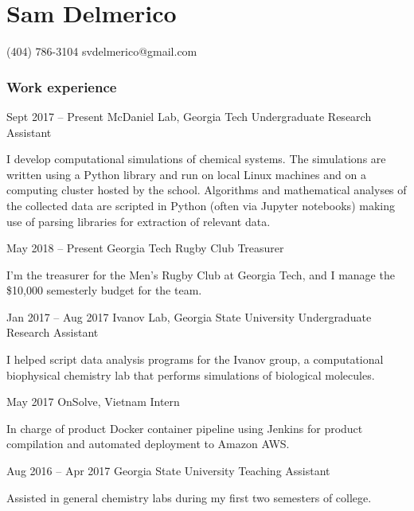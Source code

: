 \documentclass{tccv}
\begin{document}
\part[]{Sam Delmerico}

    {(404) 786-3104}
    {svdelmerico@gmail.com}

\section{Work experience}

\begin{eventlist}

\item{Sept 2017 -- Present}
     {McDaniel Lab, Georgia Tech}
     {Undergraduate Research Assistant}

I develop computational simulations of chemical systems. The simulations are written using a Python library and run on local Linux machines and on a computing cluster hosted by the school. Algorithms and mathematical analyses of the collected data are scripted in Python (often via Jupyter notebooks) making use of parsing libraries for extraction of relevant data.

\item{May 2018 -- Present}
     {Georgia Tech Rugby Club}
     {Treasurer}

I'm the treasurer for the Men's Rugby Club at Georgia Tech, and I manage the \$10,000 semesterly budget for the team.

\item{Jan 2017 -- Aug 2017}
     {Ivanov Lab, Georgia State University}
     {Undergraduate Research Assistant}

I helped script data analysis programs for the Ivanov group, a computational biophysical chemistry lab that performs simulations of biological molecules.

\item{May 2017}
     {OnSolve, Vietnam}
     {Intern}

In charge of product Docker container pipeline using Jenkins for product compilation and automated deployment to Amazon AWS.

\item{Aug 2016 -- Apr 2017}
     {Georgia State University}
     {Teaching Assistant}

Assisted in general chemistry labs during my first two semesters of college.

\end{eventlist}
\end{document}

